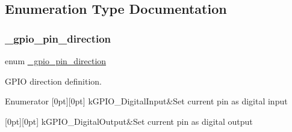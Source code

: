 \subsection{Enumeration Type Documentation}
\mbox{\label{group__gpio_ga0df4be96fa56f3bdd7bfa048fdaacd6b}} 
\subsubsection{\texorpdfstring{\_gpio\_pin\_direction}{\_gpio\_pin\_direction}}
{\footnotesize\ttfamily enum \mbox{\hyperlink{group__gpio_ga0df4be96fa56f3bdd7bfa048fdaacd6b}{\+\_\+gpio\+\_\+pin\+\_\+direction}}}



G\+P\+IO direction definition. 

\begin{DoxyEnumFields}{Enumerator}
[0pt][0pt]{}\mbox{\label{group__gpio_gga0df4be96fa56f3bdd7bfa048fdaacd6babacf19933be1940ab40c83535e6a46d4}} 
k\+G\+P\+I\+O\+\_\+\+Digital\+Input&Set current pin as digital input \\
\hline

[0pt][0pt]{}\mbox{\label{group__gpio_gga0df4be96fa56f3bdd7bfa048fdaacd6ba509ebcd228fc813cf4afcacd258680f9}} 
k\+G\+P\+I\+O\+\_\+\+Digital\+Output&Set current pin as digital output \\
\hline

\end{DoxyEnumFields}
